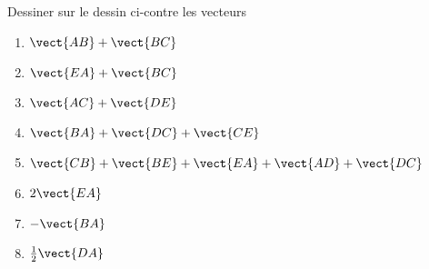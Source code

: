 
\begin{exercice}\label{exosmath-0105}

    \begin{multicols}{2}

    Dessiner sur le dessin ci-contre les vecteurs
    \begin{enumerate}
        \item
            \( \vect{ AB }+\vect{ BC }\)
        \item
            \( \vect{ EA }+\vect{ BC }\)
        \item
             \( \vect{ AC }+\vect{ DE }\)
        \item
            \( \vect{ BA }+\vect{ DC }+\vect{ CE }\)
         \item
             \( \vect{ CB }+\vect{ BE }+\vect{ EA }+\vect{ AD }+\vect{ DC }\)
         \item
             \( 2\vect{ EA }\)
         \item
             \( -\vect{ BA }\)
         \item
             \( \frac{ 1 }{2}\vect{ DA }\)
    \end{enumerate}

    \columnbreak   
    \begin{center}

    \end{center}

    \end{multicols}

\end{exercice}
